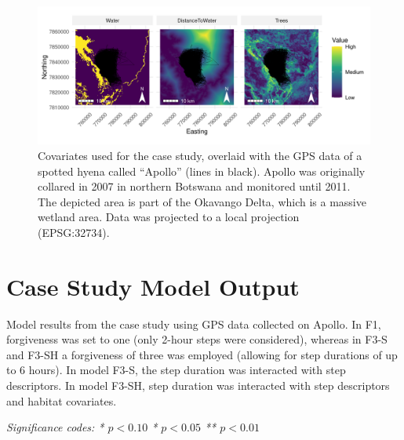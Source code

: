 \documentclass[abstract=on,10pt,a4paper,bibliography=totocnumbered]{article}
\begin{document}
\begin{figure}[htpb]
  \begin{center}
  \includegraphics[width = \textwidth]{99_CaseStudyCovariates.png}
  \caption{Covariates used for the case study, overlaid with the GPS data of a
  spotted hyena called ``Apollo'' (lines in black). Apollo was originally
  collared in 2007 in northern Botswana and monitored until 2011. The depicted
  area is part of the Okavango Delta, which is a massive wetland area. Data was
  projected to a local projection (EPSG:32734).}
  \label{CaseStudyCovariates}
  \end{center}
\end{figure}

\newpage
\section{Case Study Model Output}

\begin{table}[htpb]
  \begin{center}
  \caption{Model results from the case study using GPS data collected on Apollo.
  In F1, forgiveness was set to one (only 2-hour steps were considered), whereas
  in F3-S and F3-SH a forgiveness of three was employed (allowing for step
  durations of up to 6 hours). In model F3-S, the step duration was interacted
  with step descriptors. In model F3-SH, step duration was interacted with step
  descriptors and habitat covariates.}
  \label{CaseStudyTable}
    \begin{adjustbox}{max width=0.70\textwidth}
    \begin{threeparttable}[h]
      
      \begin{tablenotes}
       \item \textit{Significance codes: * \(p < 0.10\) \quad ** \(p < 0.05\)
        \quad *** \(p < 0.01\)}
      \end{tablenotes}
    \end{threeparttable}
  \end{adjustbox}
  \end{center}
\end{table}

\newpage
\begingroup
\singlespacing
{}
\endgroup
\end{document}
